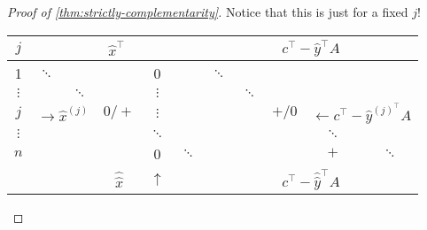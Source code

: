 \begin{proof}[Proof of \autoref{thm:strictly-complementarity}]
	Notice that this is just for a fixed \(j\)!
	\begin{table}[H]
		\centering
		\begin{tabular}{c|ccccc|ccccc}
			\toprule
			\(j\)      & \multicolumn{5}{c|}{\(\hat{x}^{\top}\)}   & \multicolumn{5}{c}{\(c^{\top} - \hat{y}^{\top}A\)}                                                                                                                                                                                                                                    \\
			\midrule
			1          & \(\ddots\)                                &                                                    &                   & 0            &            & \(\ddots\)                                             &            &                                                                                  &            &            \\
			\(\vdots\) &                                           & \(\ddots\)                                         &                   & \(\vdots\)   &            &                                                        & \(\ddots\) &                                                                                  &            &            \\
			\(j\)      & \multicolumn{2}{c}{\(\to \hat{x}^{(j)}\)} & \(0/+\)                                            & \(\vdots\)        &              &            &                                                        & \(+/0\)    & \multicolumn{2}{c}{\footnotesize{\(\leftarrow c^{\top}-\hat{y}^{(j)^{\top}}A\)}}                           \\
			\(\vdots\) &                                           &                                                    &                   & \(\ddots\)   &            &                                                        &            &                                                                                  & \(\ddots\) &            \\
			\(n\)      &                                           &                                                    &                   & 0            & \(\ddots\) &                                                        &            &                                                                                  & \(+\)      & \(\ddots\) \\
			\hline
			           &                                           &                                                    & \(\hat{\hat{x}}\) & \(\uparrow\) &            & \multicolumn{5}{c}{\(c^{\top}-\hat{\hat{y}}^{\top}A\)}                                                                                                                           \\

\end{tabular}
\end{table}
\end{proof}
